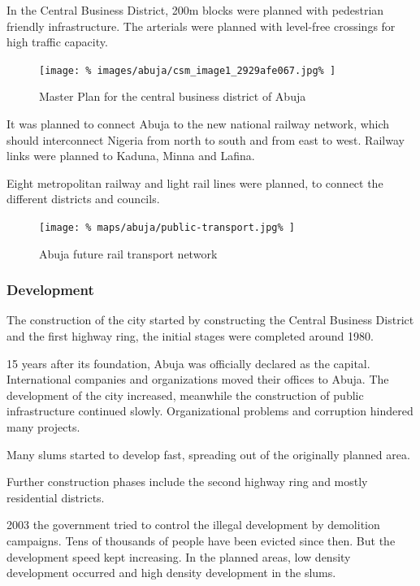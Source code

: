 \documentclass[twocolumn]{article}
\begin{document}
			In the Central Business District, 200m blocks were planned with pedestrian friendly infrastructure.
			The arterials were planned with level-free crossings for high traffic capacity.
			
			\begin{figure}[H]
				\texttt{[image: \%
					images/abuja/csm\_image1\_2929afe067.jpg\%
				]}
				\caption{Master Plan for the central business district of Abuja\cite{ASplusP:MasterPlanReview}}
				\label{fig:map:abuja-master-plan-cbd}
			\end{figure}	
			
			It was planned to connect Abuja to the new national railway network, which should interconnect Nigeria from north to south and from east to west.
			Railway links were planned to Kaduna, Minna and Lafina.
			
			Eight metropolitan railway and light rail lines were planned, to connect the different districts and councils. 
			
			\begin{figure}[H]
				\texttt{[image: \%
					maps/abuja/public-transport.jpg\%
				]}
				\caption{Abuja future rail transport network\cite{ASplusP:AbujaTransportationConcept}}
				\label{fig:map:abuja-future-rail-network}
			\end{figure}	
			
			
			\subsubsection{Development}
			
			The construction of the city started by constructing the Central Business District and the first highway ring, the initial stages were completed around 1980.
			
			15 years after its foundation, Abuja was officially declared as the capital. International companies and organizations moved their offices to Abuja.
			The development of the city increased, meanwhile the construction of public infrastructure continued slowly. Organizational problems and corruption hindered many projects.
			
			Many slums started to develop fast, spreading out of the originally planned area.

			
			
			Further construction phases include the second highway ring and mostly residential districts.
			
			2003 the government tried to control the illegal development by demolition campaigns. Tens of thousands of people have been evicted since then. But the development speed kept increasing. In the planned areas, low density development occurred and high density development in the slums.
			
\end{document}
